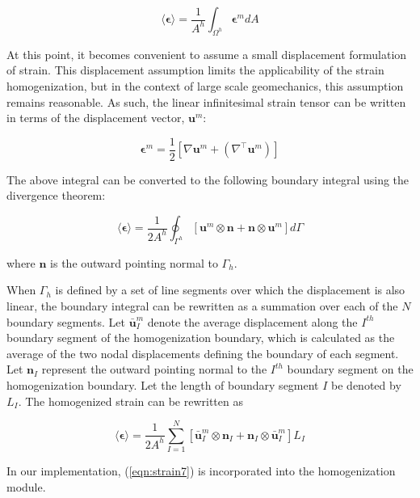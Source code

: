 \begin{equation}
\langle\boldsymbol{\epsilon}\rangle=\frac{1}{A^{h}}\int_{\Omega^{h}}\boldsymbol{\epsilon}^m dA\label{eqn:strain2}
\end{equation}

At this point, it becomes convenient to assume a small displacement formulation of strain. This displacement assumption limits the applicability of the strain homogenization, but in the context of large scale geomechanics, this assumption remains reasonable. As such, the linear infinitesimal strain tensor can be written in terms of the displacement vector, $\mathbf{u}^m$:

\begin{equation}
\boldsymbol{\epsilon}^m=\frac{1}{2}\left[\nabla\mathbf{u}^m+\left(\nabla^\top \mathbf{u}^m\right)\right]\label{eqn:strain1}
\end{equation}

The above integral can be converted to the following boundary integral using the divergence theorem:

\begin{equation}
\langle\boldsymbol{\epsilon}\rangle=\frac{1}{2A^{h}}\oint_{\Gamma^{h}}\left[\mathbf{u}^m\otimes\mathbf{n}+\mathbf{n}\otimes\mathbf{u}^m\right]d\Gamma\label{eqn:strain5-1}
\end{equation}

where $\mathbf{n}$ is the outward pointing normal to $\Gamma_h$.

When $\Gamma_h$ is defined by a set of line segments over which the displacement is also linear, the boundary integral can be rewritten as a summation over each of the $N$ boundary segments. Let $\bar{\mathbf{u}}^m_{I}$ denote the average displacement along the $I^{th}$ boundary segment of the homogenization boundary, which is calculated as the average of the two nodal displacements defining the boundary of each segment. Let $\mathbf{n}_{I}$ represent the outward pointing normal to the $I^{th}$ boundary segment on the homogenization boundary.  Let the length of boundary segment $I$ be denoted by $L_{I}$. The homogenized strain can be rewritten as

\begin{equation}
\langle\boldsymbol{\epsilon}\rangle=\frac{1}{2A^{h}}\sum_{I=1}^{N}\left[\bar{\mathbf{u}}^m_{I}\otimes\mathbf{n}_{I}+\mathbf{n}_{I}\otimes\bar{\mathbf{u}}^m_{I}\right]L_{I}\label{eqn:strain7}
\end{equation}

In our implementation, (\ref{eqn:strain7}) is incorporated into the homogenization module.

